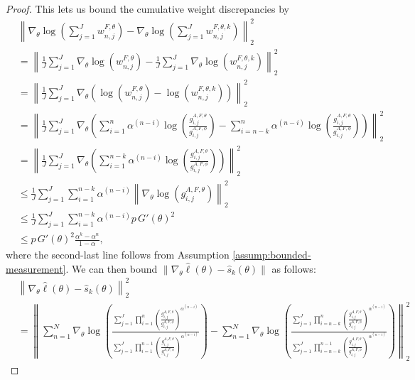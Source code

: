\begin{proof}
This lets us bound the cumulative weight discrepancies by
\begin{align}
    &  \left\lVert\nabla_\theta\log\left(\sum_{j=1}^J w_{n,j}^{F,\theta}\right)-\nabla_\theta\log\left(\sum_{j=1}^J w_{n,j}^{F,\theta,k}\right)\right\rVert_2^2\\
    &= \left\lVert\frac{1}{J}\sum_{j=1}^J \nabla_\theta \log\left(w_{n,j}^{F,\theta}\right)-\frac{1}{J}\sum_{j=1}^J \nabla_\theta \log\left(w_{n,j}^{F,\theta,k}\right)\right\rVert_2^2 \\
    &= \left\lVert\frac{1}{J}\sum_{j=1}^J \nabla_\theta \left(\log\left(w_{n,j}^{F,\theta}\right)-\log\left(w_{n,j}^{F,\theta,k}\right)\right)\right\rVert_2^2\\
    &= \left\lVert\frac{1}{J}\sum_{j=1}^J \nabla_\theta \left(\sum_{i=1}^n\alpha^{(n-i)}\log\left(\frac{g_{i,j}^{A,F,\theta}}{g_{i,j}^{A,F,\phi}} \right) - \sum_{i=n-k}^n{\alpha^{(n-i)}}\log\left(\frac{g_{i,j}^{A,F,\theta}}{g_{i,j}^{A,F,\phi}} \right)\right)\right\rVert_2^2 \\
    &= \left\lVert\frac{1}{J}\sum_{j=1}^J \nabla_\theta \left(\sum_{i=1}^{n-k}\alpha^{(n-i)}\log\left(\frac{g_{i,j}^{A,F,\theta}}{g_{i,j}^{A,F,\phi}} \right) \right)\right\rVert_2^2\\
    &\leq \frac{1}{J}\sum_{j=1}^J \sum_{i=1}^{n-k}\alpha^{(n-i)}\left\lVert\nabla_\theta\log\left(g_{i,j}^{A,F,\theta} \right)\right\rVert_2^2\\
    &\leq \frac{1}{J}\sum_{j=1}^J \sum_{i=1}^{n-k}\alpha^{(n-i)}p \, G'(\theta)^2\\
    &\leq p \, G'(\theta)^2\frac{\alpha^k-\alpha^n}{1-\alpha},
\end{align}
where the second-last line follows from Assumption \ref{assump:bounded-measurement}.
We can then bound $\|\nabla_\theta\hat\ell(\theta) - \hat s_k(\theta)\|$ as follows:
\begin{align}
    &\left\lVert\nabla_\theta\hat\ell(\theta) - \hat s_k(\theta) \right\rVert_2^2
    \\ \nonumber
    &= \left\lVert\sum_{n=1}^N \nabla_\theta \log\left(\frac{\sum_{j=1}^J\prod_{i=1}^n\left(\frac{g_{i,j}^{A,F,\theta}}{g_{i,j}^{A,F,\phi}} \right)^{\alpha^{(n-i)}}}{\sum_{j=1}^J\prod_{i=1}^{n-1}\left(\frac{g_{i,j}^{A,F,\theta}}{g_{i,j}^{A,F,\phi}} \right)^{\alpha^{(n-i)}}}\right) - \sum_{n=1}^N \nabla_\theta\log\left(\frac{\sum_{j=1}^J\prod_{i=n-k}^n\left(\frac{g_{i,j}^{A,F,\theta}}{g_{i,j}^{A,F,\phi}} \right)^{\alpha^{(n-i)}}}{\sum_{j=1}^J\prod_{i=n-k}^{n-1}\left(\frac{g_{i,j}^{A,F,\theta}}{g_{i,j}^{A,F,\phi}} \right)^{\alpha^{(n-i)}}}\right) \right\rVert_2^2

\end{align}
\end{proof}
